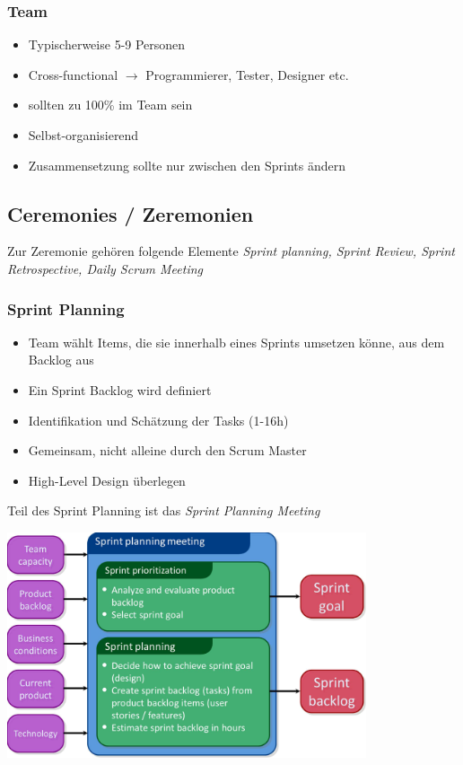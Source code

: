 \documentclass{report}
\newenvironment{Figure}
	{\par\medskip\noindent\minipage{\linewidth}}
	{\endminipage\par\medskip}
\theoremstyle{definition}
\theoremstyle{example}
\begin{document}
\subsubsection{Team}
\begin{itemize}
	\item Typischerweise 5-9 Personen
	\item Cross-functional $\rightarrow$ Programmierer, Tester, Designer etc.
	\item sollten zu 100\% im Team sein
	\item Selbst-organisierend
	\item Zusammensetzung sollte nur zwischen den Sprints ändern
\end{itemize}

\subsection{Ceremonies / Zeremonien}
Zur Zeremonie gehören folgende Elemente \textit{Sprint planning, Sprint Review, Sprint Retrospective, Daily Scrum Meeting}

\subsubsection{Sprint Planning}
\begin{itemize}
	\item Team wählt Items, die sie innerhalb eines Sprints umsetzen könne, aus dem Backlog aus
	\item Ein Sprint Backlog wird definiert
	\item Identifikation und Schätzung der Tasks (1-16h)
	\item Gemeinsam, nicht alleine durch den Scrum Master
	\item High-Level Design überlegen
\end{itemize}
Teil des Sprint Planning ist das \textit{Sprint Planning Meeting}
\begin{Figure}
\centering
\includegraphics[width=400px]{img/SprintPlanningMeeting.png}
	\label{fig:Sprint Planning Meeting}
\end{Figure}
\end{document}

